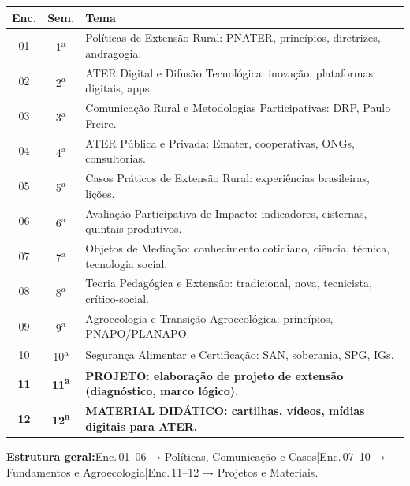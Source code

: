 \documentclass[11pt,a4paper]{article}
\begin{document}
\begin{small}
\renewcommand{\arraystretch}{1.35}
\begin{tabularx}{\textwidth}{@{}c c X@{}}
\toprule
\textbf{Enc.} & \textbf{Sem.} & \textbf{Tema} \\
\midrule
01 & 1\textsuperscript{a} & Políticas de Extensão Rural: PNATER, princípios, diretrizes, andragogia. \\
02 & 2\textsuperscript{a} & ATER Digital e Difusão Tecnológica: inovação, plataformas digitais, apps. \\
03 & 3\textsuperscript{a} & Comunicação Rural e Metodologias Participativas: DRP, Paulo Freire. \\
04 & 4\textsuperscript{a} & ATER Pública e Privada: Emater, cooperativas, ONGs, consultorias. \\
05 & 5\textsuperscript{a} & Casos Práticos de Extensão Rural: experiências brasileiras, lições. \\
06 & 6\textsuperscript{a} & Avaliação Participativa de Impacto: indicadores, cisternas, quintais produtivos. \\
07 & 7\textsuperscript{a} & Objetos de Mediação: conhecimento cotidiano, ciência, técnica, tecnologia social. \\
08 & 8\textsuperscript{a} & Teoria Pedagógica e Extensão: tradicional, nova, tecnicista, crítico-social. \\
09 & 9\textsuperscript{a} & Agroecologia e Transição Agroecológica: princípios, PNAPO/PLANAPO. \\
10 & 10\textsuperscript{a} & Segurança Alimentar e Certificação: SAN, soberania, SPG, IGs. \\
\rowcolor{uefslight!70!white}
\textbf{11} & \textbf{11\textsuperscript{a}} & \textbf{\textsf{PROJETO}: elaboração de projeto de extensão (diagnóstico, marco lógico).} \\
\rowcolor{uefslight!70!white}
\textbf{12} & \textbf{12\textsuperscript{a}} & \textbf{\textsf{MATERIAL DIDÁTICO}: cartilhas, vídeos, mídias digitais para ATER.} \\
\bottomrule
\end{tabularx}
\end{small}

\begin{tcolorbox}[uefsbox]
\textbf{Estrutura geral:}\enspace Enc.\,01--06 → Políticas, Comunicação e Casos\enspace|\enspace Enc.\,07--10 → Fundamentos e Agroecologia\enspace|\enspace Enc.\,11--12 → Projetos e Materiais.
\end{tcolorbox}
\end{document}
